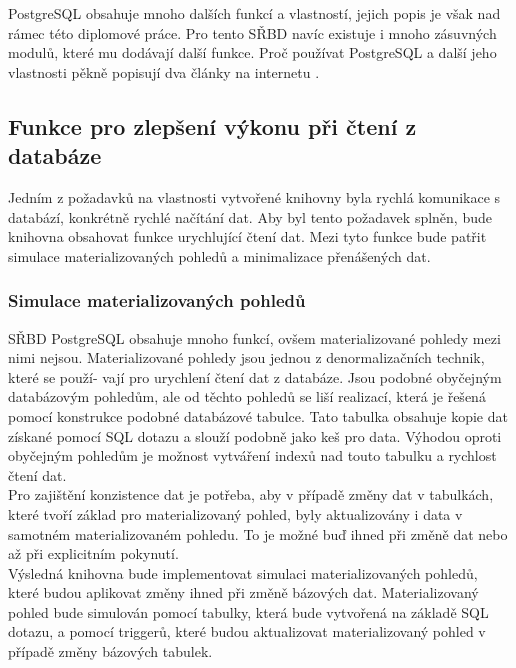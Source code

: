 \documentclass[ing,male,java,dept456]{diploma}						%
\begin{document}
PostgreSQL obsahuje mnoho dalších funkcí a vlastností, jejich popis je však nad rámec této diplomové práce. Pro tento SŘBD navíc existuje i mnoho zásuvných modulů, které mu dodávají další funkce. Proč používat PostgreSQL a další jeho vlastnosti pěkně popisují dva články na internetu \cite{postgre, postgre2}.

\subsection{Funkce pro zlepšení výkonu při čtení z databáze}
\label{subsec:ReadOpt}

Jedním z požadavků na vlastnosti vytvořené knihovny byla rychlá komunikace s databází, konkrétně rychlé načítání dat. Aby byl tento požadavek splněn, bude knihovna obsahovat funkce urychlující čtení dat. Mezi tyto funkce bude patřit simulace materializovaných pohledů a minimalizace přenášených dat.

\subsubsection{Simulace materializovaných pohledů}

SŘBD PostgreSQL obsahuje mnoho funkcí, ovšem materializované pohledy mezi nimi nejsou. Materializované pohledy jsou jednou z denormalizačních technik, které se použí- vají pro urychlení čtení dat z databáze. Jsou podobné obyčejným databázovým pohledům, ale od těchto pohledů se liší realizací, která je řešená pomocí konstrukce podobné databázové tabulce. Tato tabulka obsahuje kopie dat získané pomocí SQL dotazu a slouží podobně jako keš pro data. Výhodou oproti obyčejným pohledům je možnost vytváření indexů nad touto tabulku a rychlost čtení dat. \\
Pro zajištění konzistence dat je potřeba, aby v případě změny dat v tabulkách, které tvoří základ pro materializovaný pohled, byly aktualizovány i data v samotném materializovaném pohledu. To je možné buď ihned při změně dat nebo až při explicitním pokynutí. \\

Výsledná knihovna bude implementovat simulaci materializovaných pohledů, které budou aplikovat změny ihned při změně bázových dat. Materializovaný pohled bude simulován pomocí tabulky, která bude vytvořená na základě SQL dotazu, a pomocí triggerů, které budou aktualizovat materializovaný pohled v případě změny bázových tabulek. \\
\end{document}
